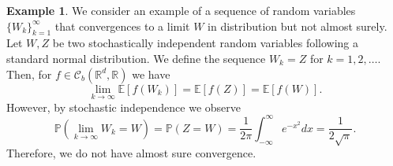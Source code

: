 \documentclass[12pt]{article}
\theoremstyle{definition}
\newtheorem{example}[example]{Example}
\numberwithin{equation}{section}
\newcommand{\R}{\mathbb{R}}
\newcommand{\BP}{\mathbb{P}}
\newcommand{\CC}{\mathcal{C}}
\newcommand{\ev}[1]{\mathbb{E}\left[{#1}\right]}
\begin{document}
\begin{example}
  We consider an example of a sequence of random variables $\{W_k\}_{k=1}^\infty$ that convergences to a limit $W$ in distribution but not almost surely.
  Let $W,Z$ be two stochastically independent random variables following a standard normal distribution. We define the sequence $W_k = Z$ for $k=1,2,\dots$. Then, for $f \in \CC_b(\R^d, \R)$ we have
  \begin{equation*}
    \lim_{k \rightarrow \infty} \ev{f(W_k)} = \ev{f(Z)} = \ev{f(W)}.
  \end{equation*}
  However, by stochastic independence we observe
  \begin{equation*}
    \BP(\lim_{k \rightarrow \infty} W_k = W) = \BP(Z = W) = \frac{1}{2\pi}\int_{-\infty}^\infty e^{-x^2} dx = \frac{1}{2\sqrt{\pi}}.
  \end{equation*}
  Therefore, we do not have almost sure convergence.
\end{example}
\end{document}
